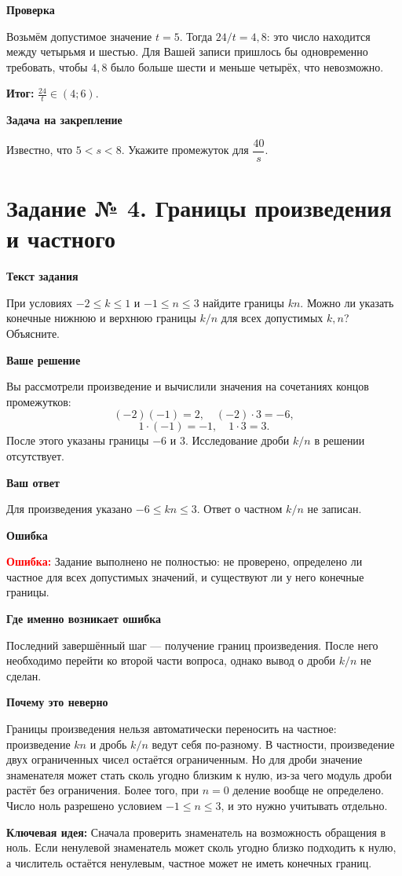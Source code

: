 \documentclass[12pt,a4paper]{article}
\newcommand{\err}{\textcolor{red}{\textbf{Ошибка:}}}
\newcommand{\idea}{\textcolor{blue!60!black}{\textbf{Ключевая идея:}}}
\newcommand{\result}{\textcolor{teal!60!black}{\textbf{Итог:}}}
\newcommand{\reviewhead}[1]{\medskip\textbf{#1}\par}
\begin{document}
\reviewhead{Проверка}
Возьмём допустимое значение $t=5$. Тогда $24/t=4{,}8$: это число находится между четырьмя и шестью. Для Вашей записи пришлось бы одновременно требовать, чтобы $4{,}8$ было больше шести и меньше четырёх, что невозможно.

\result{} $\displaystyle \frac{24}{t}\in(4;6)$.

\reviewhead{Задача на закрепление}
Известно, что $5<s<8$. Укажите промежуток для $\dfrac{40}{s}$.

\newpage
{}\label{task:4}
\section*{Задание № 4. Границы произведения и частного}
\reviewhead{Текст задания}
При условиях $-2\le k\le1$ и $-1\le n\le3$ найдите границы $kn$. Можно ли указать конечные нижнюю и верхнюю границы $k/n$ для всех допустимых $k,n$? Объясните.

\reviewhead{Ваше решение}
Вы рассмотрели произведение и вычислили значения на сочетаниях концов промежутков:
\[
(-2)(-1)=2,\quad (-2)\cdot3=-6,
\]
\[
1\cdot(-1)=-1,\quad 1\cdot3=3.
\]
После этого указаны границы $-6$ и $3$. Исследование дроби $k/n$ в решении отсутствует.

\reviewhead{Ваш ответ}
Для произведения указано $-6\le kn\le3$. Ответ о частном $k/n$ не записан.

\reviewhead{Ошибка}
\err{} Задание выполнено не полностью: не проверено, определено ли частное для всех допустимых значений, и существуют ли у него конечные границы.

\reviewhead{Где именно возникает ошибка}
Последний завершённый шаг --- получение границ произведения. После него необходимо перейти ко второй части вопроса, однако вывод о дроби $k/n$ не сделан.

\reviewhead{Почему это неверно}
Границы произведения нельзя автоматически переносить на частное: произведение $kn$ и дробь $k/n$ ведут себя по-разному. В частности, произведение двух ограниченных чисел остаётся ограниченным. Но для дроби значение знаменателя может стать сколь угодно близким к нулю, из-за чего модуль дроби растёт без ограничения. Более того, при $n=0$ деление вообще не определено. Число ноль разрешено условием $-1\le n\le3$, и это нужно учитывать отдельно.

\idea{} Сначала проверить знаменатель на возможность обращения в ноль. Если ненулевой знаменатель может сколь угодно близко подходить к нулю, а числитель остаётся ненулевым, частное может не иметь конечных границ.
\end{document}
